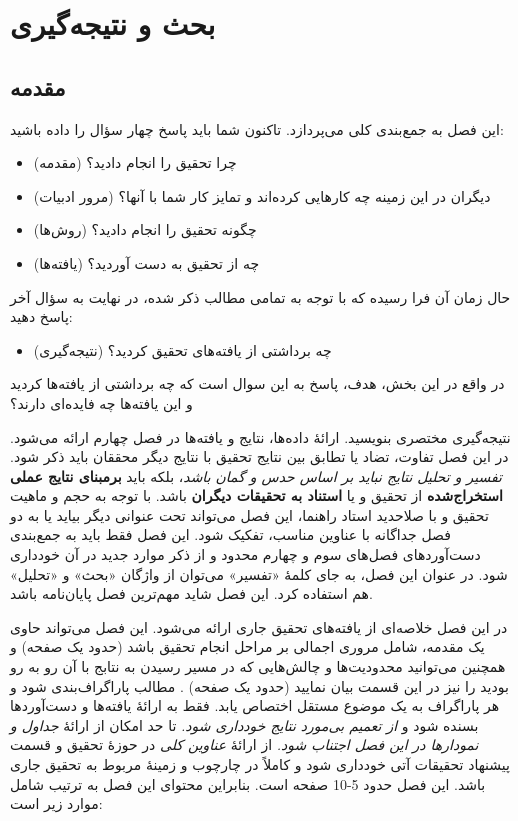 \chapter{بحث و نتیجه‌گیری}
\section{مقدمه}
این فصل به جمع‌بندی کلی \پ می‌پردازد. تاکنون شما باید پاسخ چهار سؤال را داده باشید:
\begin{itemize}
	\item
	چرا تحقیق را انجام دادید؟ (مقدمه)
	\item
	دیگران در این زمینه‌ چه کارهایی کرده‌اند و تمایز کار شما با آنها؟ (مرور ادبیات)
	\item
	چگونه تحقیق را انجام دادید؟ (روش‌ها)
	\item
	چه از تحقیق به دست آوردید؟ (یافته‌ها)
\end{itemize}
حال زمان آن فرا رسیده که با توجه به تمامی مطالب ذکر شده، در نهایت به سؤال آخر پاسخ دهید:
\begin{itemize}
	\item
	چه برداشتی از یافته‌های تحقیق کردید؟ (نتیجه‌گیری)
\end{itemize}
در واقع در این بخش، هدف، پاسخ به این سوال است که چه برداشتی از یافته‌ها کردید و این یافته‌ها چه فایده‌ای دارند؟

نتیجه‌گیری مختصری بنویسید. ارائهٔ داده‌ها، نتایج و یافته‌ها در فصل چهارم ارائه می‌شود. در این فصل تفاوت، تضاد یا تطابق بین نتایج تحقیق با نتایج دیگر محققان باید ذکر شود.
\emph{تفسیر و تحلیل نتایج نباید بر اساس حدس و گمان باشد}،
بلکه باید
\textbf{برمبنای نتایج عملی استخراج‌شده}
از تحقیق و یا
\textbf{استناد به تحقیقات دیگران}
باشد.
با توجه به حجم و ماهیت تحقیق و با صلاحدید استاد راهنما، این فصل می‌تواند تحت عنوانی دیگر بیاید یا به دو فصل جداگانه با عناوین مناسب، تفکیک شود. این فصل فقط باید به جمع‌بندی دست‌آوردهای فصل‌های سوم و چهارم محدود و از ذکر موارد جدید در آن خودداری شود. در عنوان این فصل، به جای کلمهٔ «تفسیر» می‌توان از واژگان «بحث» و «تحلیل» هم استفاده کرد. این فصل شاید مهم‌ترین فصل پایان‌نامه باشد.

در این فصل خلاصه‌ای از یافته‌های تحقیق جاری ارائه می‌شود. این فصل می‌تواند حاوی یک مقدمه، شامل مروری اجمالی بر مراحل انجام تحقیق باشد (حدود یک صفحه) و همچنین می‌توانید محدودیت‌ها و چالش‌هایی که در مسیر رسیدن به نتابج با آن رو به رو بودید را نیز در این قسمت بیان نمایید (حدود یک صفحه) . مطالب پاراگراف‌بندی شود و هر پاراگراف به یک موضوع مستقل اختصاص یابد. فقط به ارائهٔ یافته‌ها و دست‌آوردها بسنده شود و
\emph{از تعمیم بی‌مورد نتایج خودداری شود.}
تا حد امکان از ارائهٔ 
\emph{جداول و نمودارها در این فصل اجتناب شود.}
از ارائهٔ 
\emph{عناوین کلی}
در حوزهٔ تحقیق و قسمت پیشنهاد تحقیقات آتی خودداری شود و کاملاً در چارچوب و زمینهٔ مربوط به تحقیق جاری باشد. این فصل حدود 5-10 صفحه است. بنابراین محتوای این فصل به ترتیب شامل موارد زیر است:

